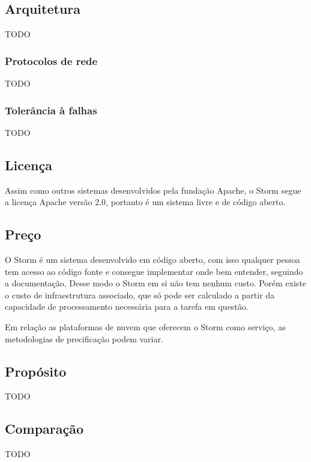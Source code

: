 \subsection{Arquitetura}

TODO

\subsubsection{Protocolos de rede}

TODO

\subsubsection{Tolerância à falhas}

TODO

\subsection{Licença}

Assim como outros sistemas desenvolvidos pela fundação Apache, o Storm segue a licença Apache versão 2.0, portanto é um sistema livre e de código aberto.

\subsection{Preço}

O Storm é um sistema desenvolvido em código aberto, com isso qualquer pessoa tem acesso ao código fonte e consegue implementar onde bem entender, seguindo a documentação. Desse modo o Storm em si não tem nenhum custo. Porém existe o custo de infraestrutura associado, que só pode ser calculado a partir da capacidade de processamento necessária para a tarefa em questão.

Em relação as plataformas de nuvem que oferecem o Storm como serviço, as metodologias de precificação podem variar.

\subsection{Propósito}

TODO

\subsection{Comparação}

TODO
